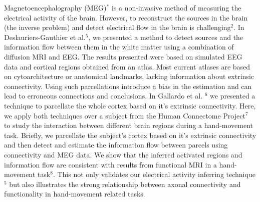 Magnetoencephalography (MEG)$^*$ is a non-invasive method of measuring the electrical activity of the brain. However, to reconstruct the sources in the brain (the inverse problem) and detect electrical flow in the brain is challenging$^2$. In Deslauriers-Gauthier et al.$^5$, we presented a method to detect sources and the information flow between them in the white matter using a combination of diffusion MRI and EEG. The results presented were based on simulated EEG data and cortical regions obtained from an atlas. Most current atlases are based on cytoarchitecture or anatomical landmarks, lacking information about extrinsic connectivity. Using such parcellations introduce a bias in the estimation and can lead to erroneous connections and conclusions. In Gallardo et al. $^6$ we presented a technique to parcellate the whole cortex based on it's extrinsic connectivity. Here, we apply both techniques over a subject from the Human Connectome Project$^7$ to study the interaction between different brain regions during a hand-movement task. Briefly, we parcellate the subject's cortex based on it's extrinsic connectivity and then detect and estimate the information flow between parcels using connectivity and MEG data. We show that the inferred activated regions and information flow are consistent with results from functional MRI in a hand-movement task$^8$. This not only validates our electrical activity inferring technique$^5$ but also illustrates the strong relationship between axonal connectivity and functionality in hand-movement related tasks. 

